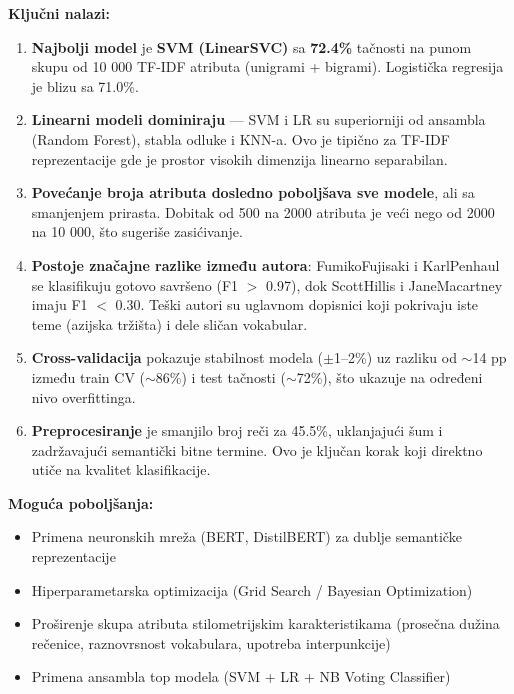 \documentclass[12pt, a4paper]{article}
\begin{document}
\textbf{Ključni nalazi:}

\begin{enumerate}
    \item \textbf{Najbolji model} je \textbf{SVM (LinearSVC)} sa \textbf{72.4\%}
    tačnosti na punom skupu od 10 000 TF-IDF atributa (unigrami + bigrami).
    Logistička regresija je blizu sa 71.0\%.

    \item \textbf{Linearni modeli dominiraju} — SVM i LR su superiorniji od
    ansambla (Random Forest), stabla odluke i KNN-a. Ovo je tipično za
    TF-IDF reprezentacije gde je prostor visokih dimenzija linearno separabilan.

    \item \textbf{Povećanje broja atributa dosledno poboljšava sve modele},
    ali sa smanjenjem prirasta. Dobitak od 500 na 2000 atributa je veći
    nego od 2000 na 10 000, što sugeriše zasićivanje.

    \item \textbf{Postoje značajne razlike između autora}: FumikoFujisaki
    i KarlPenhaul se klasifikuju gotovo savršeno (F1 $>$ 0.97), dok ScottHillis
    i JaneMacartney imaju F1 $<$ 0.30. Teški autori su uglavnom dopisnici
    koji pokrivaju iste teme (azijska tržišta) i dele sličan vokabular.

    \item \textbf{Cross-validacija} pokazuje stabilnost modela ($\pm$1–2\%)
    uz razliku od $\sim$14 pp između train CV ($\sim$86\%) i test tačnosti ($\sim$72\%),
    što ukazuje na određeni nivo overfittinga.

    \item \textbf{Preprocesiranje} je smanjilo broj reči za 45.5\%, uklanjajući
    šum i zadržavajući semantički bitne termine. Ovo je ključan korak koji
    direktno utiče na kvalitet klasifikacije.
\end{enumerate}

\textbf{Moguća poboljšanja:}
\begin{itemize}
    \item Primena neuronskih mreža (BERT, DistilBERT) za dublje semantičke reprezentacije
    \item Hiperparametarska optimizacija (Grid Search / Bayesian Optimization)
    \item Proširenje skupa atributa stilometrijskim karakteristikama
    (prosečna dužina rečenice, raznovrsnost vokabulara, upotreba interpunkcije)
    \item Primena ansambla top modela (SVM + LR + NB Voting Classifier)
\end{itemize}
\end{document}
